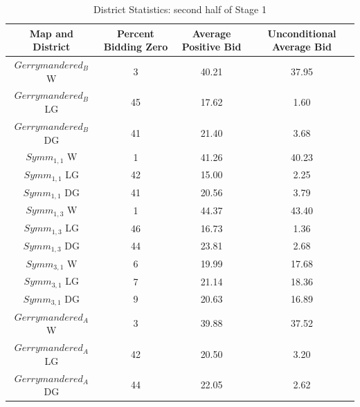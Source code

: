 \documentclass[AER]{AEA}
\begin{document}
\begin{table}
\caption{District Statistics: second half of Stage 1} 
\begin{center}
 \begin{tabular}{|c c c c|} 
 \hline
 Map and District & Percent Bidding Zero & Average Positive Bid & Unconditional Average Bid \\ [0.5ex] 
 \hline
 $Gerrymandered_B$ W & 3 & 40.21 & 37.95 \\
 $Gerrymandered_B$ LG & 45 & 17.62 & 1.60 \\
 $Gerrymandered_B$ DG & 41 & 21.40 & 3.68 \\
  \hline
 $Symm_{1,1}$ W & 1 & 41.26 & 40.23 \\
 $Symm_{1,1}$ LG & 42 & 15.00 & 2.25 \\
 $Symm_{1,1}$ DG & 41 & 20.56 & 3.79 \\
  \hline
 $Symm_{1,3}$ W & 1 & 44.37 & 43.40 \\
 $Symm_{1,3}$ LG & 46 & 16.73 & 1.36 \\
 $Symm_{1,3}$ DG & 44 & 23.81 & 2.68 \\
  \hline
 $Symm_{3,1}$ W & 6 & 19.99 & 17.68 \\
 $Symm_{3,1}$ LG & 7 & 21.14 & 18.36 \\
 $Symm_{3,1}$ DG & 9 & 20.63 & 16.89 \\
  \hline
 $Gerrymandered_A$ W & 3 & 39.88 & 37.52 \\
 $Gerrymandered_A$ LG & 42 & 20.50 & 3.20 \\
 $Gerrymandered_A$ DG & 44 & 22.05 & 2.62 \\
 \hline
\end{tabular}
\label{Tab:all_districts_zero_avg_stage_1_last}
\end{center}
\end{table}
\end{document}
